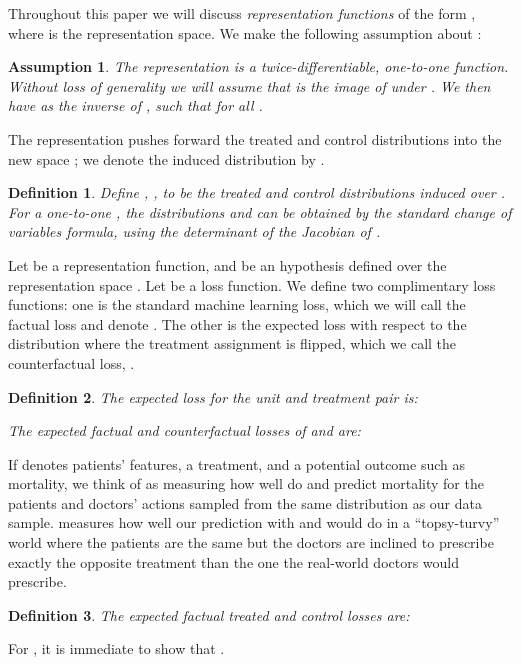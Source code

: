 \documentclass{article}
\newtheorem{thmdef}{Definition}
\newtheorem{thmasmp}{Assumption}
\begin{document}
Throughout this paper we will discuss \emph{representation functions} of the form
 , where  is the representation space. We make the following assumption about :
\begin{thmasmp}\label{asmp:inv}
The representation  is a twice-differentiable, one-to-one function. Without loss of generality we will assume that  is the image of  under . We then have  as the inverse of , such that  for all .
\end{thmasmp}
The representation  pushes forward the treated and control distributions into the new space ; we denote the induced distribution by .
\begin{thmdef}\label{def:phit}
Define , , to be the treated and control distributions induced over .
For a one-to-one , the distributions  and  can be obtained by the standard change of variables formula, using the determinant of the Jacobian of .
\end{thmdef} 

Let  be a representation function, and  be an hypothesis defined over the representation space . Let  be a loss function. We define two complimentary loss functions: one is the standard machine learning loss, which we will call the factual loss and denote . The other is the expected loss with respect to the distribution where the treatment assignment is flipped, which we call the counterfactual loss, .


\begin{thmdef}\label{def:perunitloss}
The expected loss for the unit and treatment pair  is:

The expected factual and counterfactual losses of  and  are:

\end{thmdef}

If  denotes patients' features,  a treatment, and  a potential outcome such as mortality, we think of  as measuring how well do  and  predict mortality for the patients and doctors' actions sampled from the same distribution as our data sample.  measures how well our prediction with  and  would do in a ``topsy-turvy'' world where the patients are the same but the doctors are inclined to prescribe exactly the opposite treatment than the one the real-world doctors would prescribe.

\begin{thmdef}\label{def:decompef}
The expected factual \emph{treated} and \emph{control} losses are:

\end{thmdef}
For , it is immediate to show that .
\end{document}
